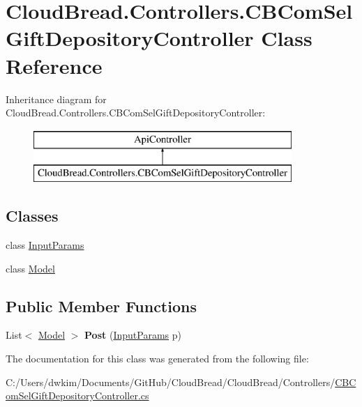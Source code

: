 \hypertarget{class_cloud_bread_1_1_controllers_1_1_c_b_com_sel_gift_depository_controller}{}\section{Cloud\+Bread.\+Controllers.\+C\+B\+Com\+Sel\+Gift\+Depository\+Controller Class Reference}
\label{class_cloud_bread_1_1_controllers_1_1_c_b_com_sel_gift_depository_controller}
Inheritance diagram for Cloud\+Bread.\+Controllers.\+C\+B\+Com\+Sel\+Gift\+Depository\+Controller\+:\begin{figure}[H]
\begin{center}
\leavevmode
\includegraphics[height=2.000000cm]{class_cloud_bread_1_1_controllers_1_1_c_b_com_sel_gift_depository_controller}
\end{center}
\end{figure}
\subsection*{Classes}
\begin{DoxyCompactItemize}
\item 
class \hyperlink{class_cloud_bread_1_1_controllers_1_1_c_b_com_sel_gift_depository_controller_1_1_input_params}{Input\+Params}
\item 
class \hyperlink{class_cloud_bread_1_1_controllers_1_1_c_b_com_sel_gift_depository_controller_1_1_model}{Model}
\end{DoxyCompactItemize}
\subsection*{Public Member Functions}
\begin{DoxyCompactItemize}
\item 
List$<$ \hyperlink{class_cloud_bread_1_1_controllers_1_1_c_b_com_sel_gift_depository_controller_1_1_model}{Model} $>$ {\bfseries Post} (\hyperlink{class_cloud_bread_1_1_controllers_1_1_c_b_com_sel_gift_depository_controller_1_1_input_params}{Input\+Params} p)\hypertarget{class_cloud_bread_1_1_controllers_1_1_c_b_com_sel_gift_depository_controller_a161c7d4063645ab6509520807b6ee406}{}\label{class_cloud_bread_1_1_controllers_1_1_c_b_com_sel_gift_depository_controller_a161c7d4063645ab6509520807b6ee406}

\end{DoxyCompactItemize}


The documentation for this class was generated from the following file\+:\begin{DoxyCompactItemize}
\item 
C\+:/\+Users/dwkim/\+Documents/\+Git\+Hub/\+Cloud\+Bread/\+Cloud\+Bread/\+Controllers/\hyperlink{_c_b_com_sel_gift_depository_controller_8cs}{C\+B\+Com\+Sel\+Gift\+Depository\+Controller.\+cs}\end{DoxyCompactItemize}
